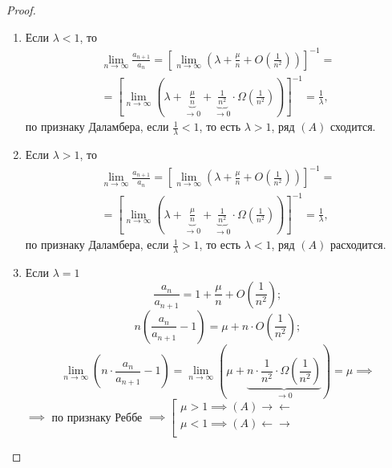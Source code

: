 \documentclass{report}
\theoremstyle{definition}
\begin{document}
\begin{proof}
  \begin{enumerate}
    \item Если $\lambda < 1$, то
          \begin{multline*}
            \underset{n\rightarrow\infty}{\lim} \frac{a_{n+1}}{a_n} = [\underset{n\rightarrow\infty}{\lim}(\lambda + \frac{\mu}{n} + O(\frac{1}{n^2}))]^{-1} = \\
            = [\underset{n\rightarrow\infty}{\lim}(\lambda + \underbrace{\frac{\mu}{n}}_{\rightarrow 0} + \underbrace{\frac{1}{n^2}}_{\rightarrow 0} \cdot \Omega(\frac{1}{n^2}))]^{-1} = \frac{1}{\lambda},
          \end{multline*}
          по признаку Даламбера, если $\frac{1}{\lambda} < 1$, то есть $\lambda > 1$, ряд $(A)$ сходится.

    \item Если $\lambda > 1$, то
          \begin{multline*}
            \underset{n\rightarrow\infty}{\lim} \frac{a_{n+1}}{a_n} = [\underset{n\rightarrow\infty}{\lim}(\lambda + \frac{\mu}{n} + O(\frac{1}{n^2}))]^{-1} = \\
            = [\underset{n\rightarrow\infty}{\lim}(\lambda + \underbrace{\frac{\mu}{n}}_{\rightarrow 0} + \underbrace{\frac{1}{n^2}}_{\rightarrow 0} \cdot \Omega(\frac{1}{n^2}))]^{-1} = \frac{1}{\lambda},
          \end{multline*}
          по признаку Даламбера, если $\frac{1}{\lambda} > 1$, то есть $\lambda < 1$, ряд $(A)$ расходится.

    \item Если $\lambda = 1$
          \begin{equation*}
            \frac{a_n}{a_{n+1}} = 1 + \frac{\mu}{n} + O(\frac{1}{n^2});
          \end{equation*}
          \begin{equation*}
            n(\frac{a_n}{a_{n+1}} - 1) = \mu + n \cdot O(\frac{1}{n^2});
          \end{equation*}
          \begin{equation*}
            \underset{n\rightarrow\infty}{\lim}(n\cdot \frac{a_n}{a_{n+1}} - 1) = \underset{n\rightarrow\infty}{\lim}(\mu + \underbrace{n \cdot \frac{1}{n^2} \cdot \Omega (\frac{1}{n^2})}_{\rightarrow 0}) = \mu \implies
          \end{equation*}
          $\implies$ по признаку Реббе $\implies \left[\begin{array}{l}
              \mu > 1 \implies (A) \rightarrow\leftarrow \\
              \mu < 1 \implies (A) \leftarrow\rightarrow \\
            \end{array} \right.$


\end{enumerate}
\end{proof}
\end{document}
